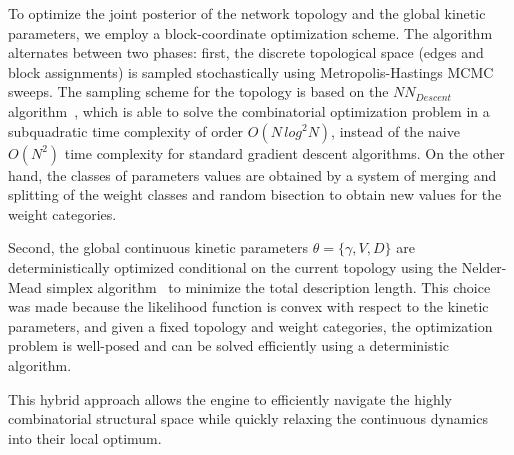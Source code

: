 \documentclass[10pt, aps, rmp,  twocolumn, superscriptaddress, floatfix, showkeys]{revtex4-2}
\begin{document}
To optimize the joint posterior of the network topology and the global kinetic parameters, we employ a block-coordinate optimization scheme. The algorithm alternates between two phases: first, the discrete topological space (edges and block assignments) is sampled stochastically using Metropolis-Hastings MCMC sweeps. The sampling scheme for the topology is based on the $NN_{Descent}$ algorithm~\cite{dong2011efficient}, which is able to solve the combinatorial optimization problem in a subquadratic time complexity of order $O(N\,log^2 N)$, instead of the naive $O(N^2)$ time complexity for standard gradient descent algorithms. On the other hand, the classes of parameters values are obtained by a system of merging and splitting of the weight classes and random bisection to obtain new values for the weight categories.

Second, the global continuous kinetic parameters $\theta = \{\gamma, V, D\}$ are deterministically optimized conditional on the current topology using the Nelder-Mead simplex algorithm~\cite{nelder1965simplex} to minimize the total description length. This choice was made because the likelihood function is convex with respect to the kinetic parameters, and given a fixed topology and weight categories, the optimization problem is well-posed and can be solved efficiently using a deterministic algorithm.

This hybrid approach allows the engine to efficiently navigate the highly combinatorial structural space while quickly relaxing the continuous dynamics into their local optimum.
\end{document}
